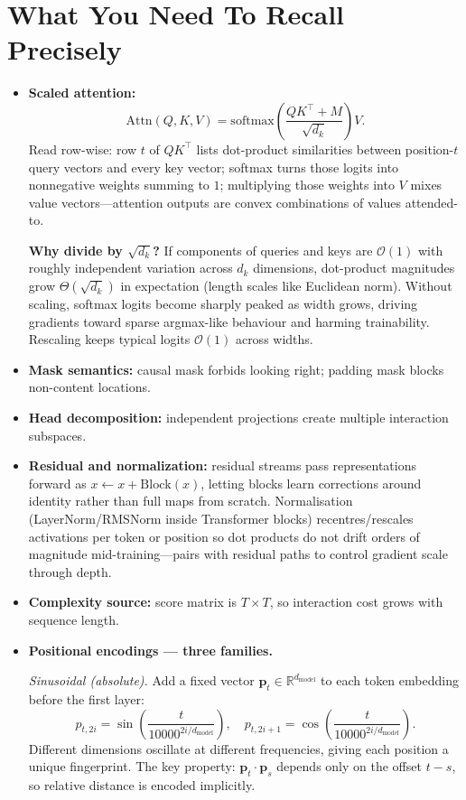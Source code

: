 \section*{What You Need To Recall Precisely}
\begin{itemize}[leftmargin=1.5em]
  \item \textbf{Scaled attention:}
  \[
    \mathrm{Attn}(Q,K,V)=\mathrm{softmax}\!\left(\frac{QK^\top+M}{\sqrt{d_k}}\right)V.
  \]
  Read row-wise: row $t$ of $QK^\top$ lists dot-product similarities between position-$t$ query vectors and every key vector; softmax turns those logits into nonnegative weights summing to $1$; multiplying those weights into $V$ mixes value vectors---attention outputs are convex combinations of values attended-to.

  \textbf{Why divide by $\sqrt{d_k}$?}
  If components of queries and keys are $\mathcal{O}(1)$ with roughly independent variation across $d_k$ dimensions, dot-product magnitudes grow \(\Theta(\sqrt{d_k})\) in expectation (length scales like Euclidean norm). Without scaling, softmax logits become sharply peaked as width grows, driving gradients toward sparse argmax-like behaviour and harming trainability. Rescaling keeps typical logits \(\mathcal{O}(1)\) across widths.

  \item \textbf{Mask semantics:} causal mask forbids looking right; padding mask blocks non-content locations.
  \item \textbf{Head decomposition:} independent projections create multiple interaction subspaces.
  \item \textbf{Residual and normalization:} residual streams pass representations forward as \(x\leftarrow x+\mathrm{Block}(x)\), letting blocks learn corrections around identity rather than full maps from scratch. Normalisation (LayerNorm/RMSNorm inside Transformer blocks) recentres/rescales activations per token or position so dot products do not drift orders of magnitude mid-training---pairs with residual paths to control gradient scale through depth.
  \item \textbf{Complexity source:} score matrix is $T\times T$, so interaction cost grows with sequence length.

  \item \textbf{Positional encodings --- three families.}

  \emph{Sinusoidal (absolute).} Add a fixed vector $\mathbf{p}_t \in \mathbb{R}^{d_{\text{model}}}$ to each token embedding before the first layer:
  \[
    p_{t,2i}   = \sin\!\left(\frac{t}{10000^{2i/d_{\text{model}}}}\right),\quad
    p_{t,2i+1} = \cos\!\left(\frac{t}{10000^{2i/d_{\text{model}}}}\right).
  \]
  Different dimensions oscillate at different frequencies, giving each position a unique fingerprint. The key property: $\mathbf{p}_t \cdot \mathbf{p}_s$ depends only on the offset $t - s$, so relative distance is encoded implicitly.


\end{itemize}
